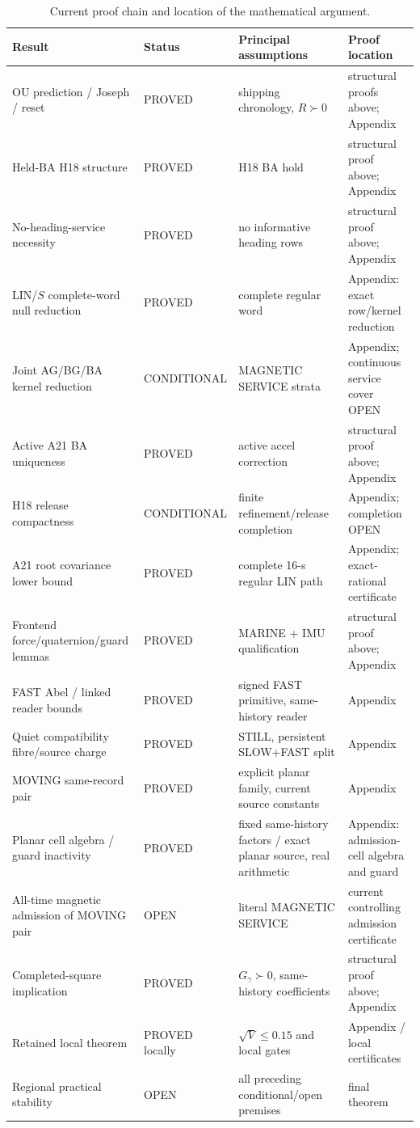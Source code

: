 \documentclass[journal]{IEEEtran}
\begin{document}
\begin{table}[t]
\centering\scriptsize
\caption{Current proof chain and location of the mathematical argument.}
\label{tab:proofroadmap}
\begin{tabular}{@{}p{}p{}p{}p{}@{}}
\toprule
Result & Status & Principal assumptions & Proof location\\
\midrule
OU prediction / Joseph / reset & PROVED & shipping chronology, $R\succ0$ & structural proofs above; Appendix\\
Held-BA H18 structure & PROVED & H18 BA hold & structural proof above; Appendix\\
No-heading-service necessity & PROVED & no informative heading rows & structural proof above; Appendix\\
LIN/$S$ complete-word null reduction & PROVED & complete regular word & Appendix: exact row/kernel reduction\\
Joint AG/BG/BA kernel reduction & CONDITIONAL & MAGNETIC SERVICE strata & Appendix; continuous service cover OPEN\\
Active A21 BA uniqueness & PROVED & active accel correction & structural proof above; Appendix\\
H18 release compactness & CONDITIONAL & finite refinement/release completion & Appendix; completion OPEN\\
A21 root covariance lower bound & PROVED & complete 16-s regular LIN path & Appendix; exact-rational certificate\\
Frontend force/quaternion/guard lemmas & PROVED & MARINE + IMU qualification & structural proof above; Appendix\\
FAST Abel / linked reader bounds & PROVED & signed FAST primitive, same-history reader & Appendix\\
Quiet compatibility fibre/source charge & PROVED & STILL, persistent SLOW+FAST split & Appendix\\
MOVING same-record pair & PROVED & explicit planar family, current source constants & Appendix\\
Planar cell algebra / guard inactivity & PROVED & fixed same-history factors / exact planar source, real arithmetic & Appendix: admission-cell algebra and guard\\
All-time magnetic admission of MOVING pair & OPEN & literal MAGNETIC SERVICE & current controlling admission certificate\\
Completed-square implication & PROVED & $G_\gamma\succ0$, same-history coefficients & structural proof above; Appendix\\
Retained local theorem & PROVED locally & $\sqrt V\le0.15$ and local gates & Appendix / local certificates\\
Regional practical stability & OPEN & all preceding conditional/open premises & final theorem\\
\bottomrule
\end{tabular}
\end{table}
\end{document}
